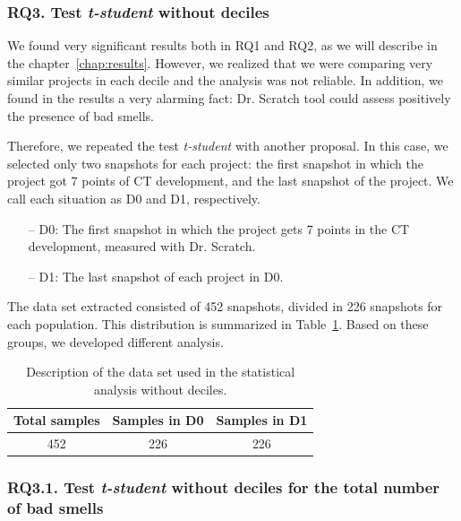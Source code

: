 \subsubsection{RQ3. Test \textit{t-student} without deciles}
\label{subsubsec:rq3_t_student_no_deciles}

We found very significant results both in RQ1 and RQ2, as we will describe in the chapter~\ref{chap:results}. However, we realized that we were comparing very similar projects in each decile and the analysis was not reliable. In addition, we found in the results a very alarming fact: Dr. Scratch tool could assess positively the presence of bad smells. 

Therefore, we repeated the test \textit{t-student} with another proposal. In this case, we selected only two snapshots for each project: the first snapshot in which the project got 7 points of CT development, and the last snapshot of the project. We call each situation as D0 and D1, respectively.

\begin{itemize}
    \item[--] D0: The first snapshot in which the project gets 7 points in the CT development, measured with Dr. Scratch. 
    \item[--] D1: The last snapshot of each project in D0.
\end{itemize}

The data set extracted consisted of 452 snapshots, divided in 226 snapshots for each population. This distribution is summarized in Table~\ref{table:distribution_without_deciles}. Based on these groups, we developed different analysis.

\begin{table}
    \centering
    \begin{tabular}{|c|c|c|}
        \hline
        \textbf{Total samples} & \textbf{Samples in D0} & \textbf{Samples in D1} \\ \hline
        452 & 226 & 226 \\ \hline
    \end{tabular}
    \caption{Description of the data set used in the statistical analysis without deciles.}
    \label{table:distribution_without_deciles}
\end{table}

\subsubsection{RQ3.1. Test \textit{t-student} without deciles for the total number of bad smells}
\label{subsubsec:RQ3_1_statistical}

